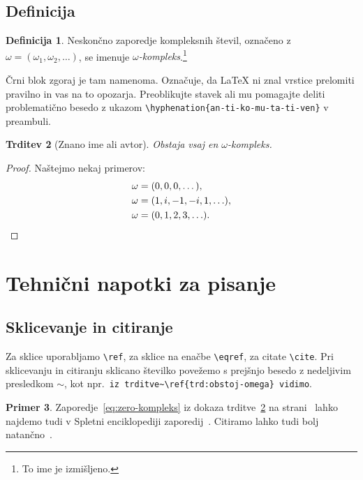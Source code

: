 \documentclass[12pt,a4paper,twoside]{article}
\theoremstyle{definition} %
\newtheorem{definicija}{Definicija}[section]
\newtheorem{primer}[definicija]{Primer}
\theoremstyle{plain} %
\newtheorem{trditev}[definicija]{Trditev}
\numberwithin{equation}{section}  %
\begin{document}
\subsection{Definicija}
\begin{definicija}
  Neskončno zaporedje kompleksnih števil, označeno z $\omega = (\omega_1, \omega_2, \ldots)$,
  se imenuje \emph{$\omega$-kompleks}.\footnote{To ime je izmišljeno.}

  Črni blok zgoraj je tam namenoma. Označuje, da \LaTeX{} ni znal vrstice prelomiti pravilno
  in vas na to opozarja. Preoblikujte stavek ali mu pomagajte deliti problematično besedo z
  ukazom \verb|\hyphenation{an-ti-ko-mu-ta-ti-ven}| v preambuli.
\end{definicija}
\begin{trditev}[Znano ime ali avtor]
  \label{trd:obstoj-omega}
  Obstaja vsaj en $\omega$-kompleks.
\end{trditev}
\begin{proof}
  Naštejmo nekaj primerov:
  \begin{align}
    \omega &= (0, 0, 0, \dots), \label{eq:zero-kompleks} \\
    \omega &= (1, i, -1, -i, 1, \ldots), \nonumber \\
    \omega &= (0, 1, 2, 3, \ldots). \nonumber \qedhere  %
  \end{align}
\end{proof}

\section{Tehnični napotki za pisanje}

\subsection{Sklicevanje in citiranje}
Za sklice uporabljamo \verb|\ref|, za sklice na enačbe \verb|\eqref|, za citate \verb|\cite|. Pri
sklicevanju in citiranju sklicano številko povežemo s prejšnjo besedo z nedeljivim presledkom
$\sim$, kot npr.\ \verb|iz trditve~\ref{trd:obstoj-omega} vidimo|.

\begin{primer}
  Zaporedje~\eqref{eq:zero-kompleks} iz dokaza trditve~\ref{trd:obstoj-omega} na
  strani~\pageref{trd:obstoj-omega} lahko najdemo tudi v Spletni enciklopediji zaporedij~\cite{oeis}.
  Citiramo lahko tudi bolj natančno~\cite[trditev 2.1, str.\ 23]{lebedev2009introduction}.
\end{primer}
\end{document}
